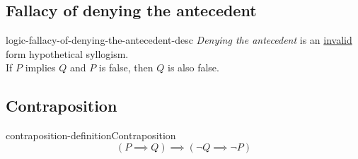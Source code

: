 \documentclass[preview]{standalone}
\begin{document}

\subsection{Fallacy of denying the antecedent}

\begin{snippet}{logic-fallacy-of-denying-the-antecedent-desc}
    \textit{Denying the antecedent}
    is an \underline{invalid} form hypothetical syllogism. \\
    If \(P\) implies \(Q\) and \(P\) is false, then \(Q\) is also false.
\end{snippet}


\subsection{Contraposition}

\begin{snippetdefinition}{contraposition-definition}{Contraposition}
    \[
        (P \implies Q) \implies (\lnot Q \implies \lnot P)
    \]
\end{snippetdefinition}
\end{document}
